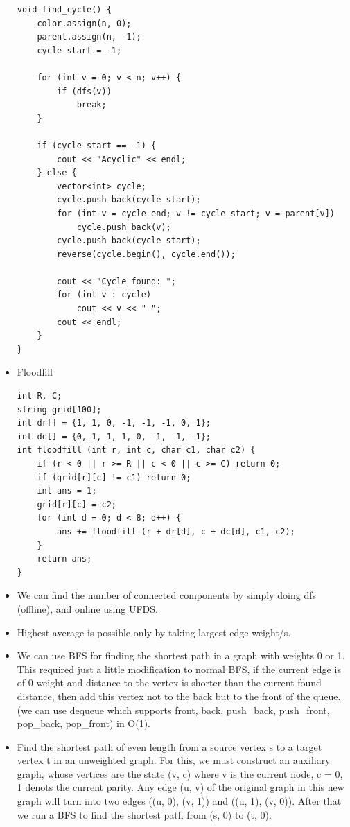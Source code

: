 \documentclass[8pt, a4paper, oneside, twocolumn]{extarticle}
\begin{document}
\begin{itemize}
\begin{verbatim}
void find_cycle() {
    color.assign(n, 0);
    parent.assign(n, -1);
    cycle_start = -1;

    for (int v = 0; v < n; v++) {
        if (dfs(v))
            break;
    }

    if (cycle_start == -1) {
        cout << "Acyclic" << endl;
    } else {
        vector<int> cycle;
        cycle.push_back(cycle_start);
        for (int v = cycle_end; v != cycle_start; v = parent[v])
            cycle.push_back(v);
        cycle.push_back(cycle_start);
        reverse(cycle.begin(), cycle.end());

        cout << "Cycle found: ";
        for (int v : cycle)
            cout << v << " ";
        cout << endl;
    }
}
    \end{verbatim}
    \item Floodfill
    \begin{verbatim}
int R, C;
string grid[100];
int dr[] = {1, 1, 0, -1, -1, -1, 0, 1};
int dc[] = {0, 1, 1, 1, 0, -1, -1, -1};
int floodfill (int r, int c, char c1, char c2) {
    if (r < 0 || r >= R || c < 0 || c >= C) return 0;
    if (grid[r][c] != c1) return 0;
    int ans = 1;
    grid[r][c] = c2;
    for (int d = 0; d < 8; d++) {
        ans += floodfill (r + dr[d], c + dc[d], c1, c2);
    }
    return ans;
}
    \end{verbatim}
    \item We can find the number of connected components by simply doing dfs (offline), and online using UFDS.
    \item Highest average is possible only by taking largest edge weight/s. 
    \item We can use BFS for finding the shortest path in a graph with weights 0 or 1. This required just a little modification to normal BFS, if the current edge is of 0 weight and distance to the vertex is shorter than the current found distance, then add this vertex not to the back but to the front of the queue. (we can use dequeue which supports front, back, push\_{}back, push\_{}front, pop\_{}back, pop\_{}front) in O(1).
    \item Find the shortest path of even length from a source vertex s to a target vertex t in an unweighted graph. For this, we must construct an auxiliary graph, whose vertices are the state (v, c) where v is the current node, c = 0, 1 denots the current parity. Any edge (u, v) of the original graph in this new graph will turn into two edges ((u, 0), (v, 1)) and ((u, 1), (v, 0)). After that we run a BFS to find the shortest path from (s, 0) to (t, 0).

\end{itemize}
\end{document}
